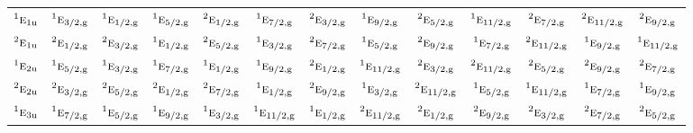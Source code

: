 \documentclass[10pt,a4paper]{article}
\numberwithin{equation}{section}
\newcommand{\irr}[1]{\text{\normalfont\scshape #1}}
\newcommand{\conjpair}[1]{{}^{#1}}
\newcommand{\ptag}[1]{\mathrm{#1}}
\begin{document}
{\begin{longtable}{@{}lcccccccccccc@{}}
$\conjpair{1}\irr{e}_{1\ptag{u}}$ & $\conjpair{1}\irr{e}_{3/2,\ptag{g}}$ & $\conjpair{1}\irr{e}_{1/2,\ptag{g}}$ & $\conjpair{1}\irr{e}_{5/2,\ptag{g}}$ & $\conjpair{2}\irr{e}_{1/2,\ptag{g}}$ & $\conjpair{1}\irr{e}_{7/2,\ptag{g}}$ & $\conjpair{2}\irr{e}_{3/2,\ptag{g}}$ & $\conjpair{1}\irr{e}_{9/2,\ptag{g}}$ & $\conjpair{2}\irr{e}_{5/2,\ptag{g}}$ & $\conjpair{1}\irr{e}_{11/2,\ptag{g}}$ & $\conjpair{2}\irr{e}_{7/2,\ptag{g}}$ & $\conjpair{2}\irr{e}_{11/2,\ptag{g}}$ & $\conjpair{2}\irr{e}_{9/2,\ptag{g}}$\\
$\conjpair{2}\irr{e}_{1\ptag{u}}$ & $\conjpair{2}\irr{e}_{1/2,\ptag{g}}$ & $\conjpair{2}\irr{e}_{3/2,\ptag{g}}$ & $\conjpair{1}\irr{e}_{1/2,\ptag{g}}$ & $\conjpair{2}\irr{e}_{5/2,\ptag{g}}$ & $\conjpair{1}\irr{e}_{3/2,\ptag{g}}$ & $\conjpair{2}\irr{e}_{7/2,\ptag{g}}$ & $\conjpair{1}\irr{e}_{5/2,\ptag{g}}$ & $\conjpair{2}\irr{e}_{9/2,\ptag{g}}$ & $\conjpair{1}\irr{e}_{7/2,\ptag{g}}$ & $\conjpair{2}\irr{e}_{11/2,\ptag{g}}$ & $\conjpair{1}\irr{e}_{9/2,\ptag{g}}$ & $\conjpair{1}\irr{e}_{11/2,\ptag{g}}$\\
$\conjpair{1}\irr{e}_{2\ptag{u}}$ & $\conjpair{1}\irr{e}_{5/2,\ptag{g}}$ & $\conjpair{1}\irr{e}_{3/2,\ptag{g}}$ & $\conjpair{1}\irr{e}_{7/2,\ptag{g}}$ & $\conjpair{1}\irr{e}_{1/2,\ptag{g}}$ & $\conjpair{1}\irr{e}_{9/2,\ptag{g}}$ & $\conjpair{2}\irr{e}_{1/2,\ptag{g}}$ & $\conjpair{1}\irr{e}_{11/2,\ptag{g}}$ & $\conjpair{2}\irr{e}_{3/2,\ptag{g}}$ & $\conjpair{2}\irr{e}_{11/2,\ptag{g}}$ & $\conjpair{2}\irr{e}_{5/2,\ptag{g}}$ & $\conjpair{2}\irr{e}_{9/2,\ptag{g}}$ & $\conjpair{2}\irr{e}_{7/2,\ptag{g}}$\\
$\conjpair{2}\irr{e}_{2\ptag{u}}$ & $\conjpair{2}\irr{e}_{3/2,\ptag{g}}$ & $\conjpair{2}\irr{e}_{5/2,\ptag{g}}$ & $\conjpair{2}\irr{e}_{1/2,\ptag{g}}$ & $\conjpair{2}\irr{e}_{7/2,\ptag{g}}$ & $\conjpair{1}\irr{e}_{1/2,\ptag{g}}$ & $\conjpair{2}\irr{e}_{9/2,\ptag{g}}$ & $\conjpair{1}\irr{e}_{3/2,\ptag{g}}$ & $\conjpair{2}\irr{e}_{11/2,\ptag{g}}$ & $\conjpair{1}\irr{e}_{5/2,\ptag{g}}$ & $\conjpair{1}\irr{e}_{11/2,\ptag{g}}$ & $\conjpair{1}\irr{e}_{7/2,\ptag{g}}$ & $\conjpair{1}\irr{e}_{9/2,\ptag{g}}$\\
$\conjpair{1}\irr{e}_{3\ptag{u}}$ & $\conjpair{1}\irr{e}_{7/2,\ptag{g}}$ & $\conjpair{1}\irr{e}_{5/2,\ptag{g}}$ & $\conjpair{1}\irr{e}_{9/2,\ptag{g}}$ & $\conjpair{1}\irr{e}_{3/2,\ptag{g}}$ & $\conjpair{1}\irr{e}_{11/2,\ptag{g}}$ & $\conjpair{1}\irr{e}_{1/2,\ptag{g}}$ & $\conjpair{2}\irr{e}_{11/2,\ptag{g}}$ & $\conjpair{2}\irr{e}_{1/2,\ptag{g}}$ & $\conjpair{2}\irr{e}_{9/2,\ptag{g}}$ & $\conjpair{2}\irr{e}_{3/2,\ptag{g}}$ & $\conjpair{2}\irr{e}_{7/2,\ptag{g}}$ & $\conjpair{2}\irr{e}_{5/2,\ptag{g}}$\\

\end{longtable}}
\end{document}
